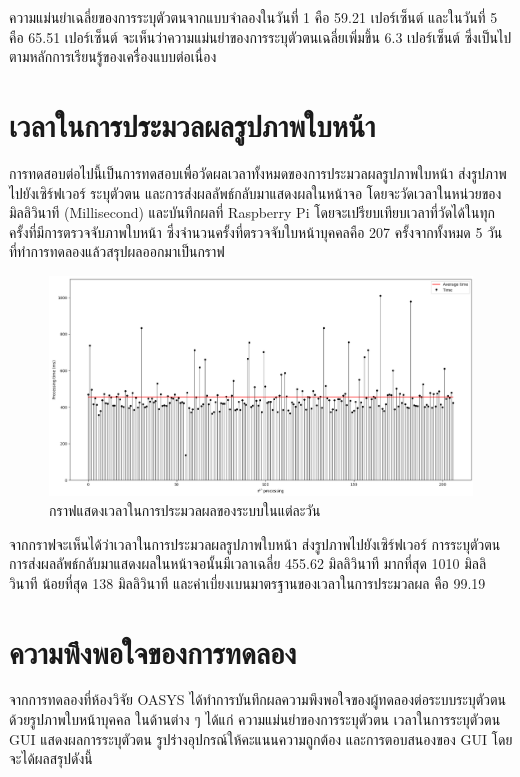 \indent ความแม่นยำเฉลี่ยของการระบุตัวตนจากแบบจำลองในวันที่ 1 คือ 59.21 เปอร์เซ็นต์ และในวันที่ 5 คือ 65.51 เปอร์เซ็นต์ จะเห็นว่าความแม่นยำของการระบุตัวตนเฉลี่ยเพิ่มขึ้น 6.3 เปอร์เซ็นต์ 
ซึ่งเป็นไปตามหลักการเรียนรู้ของเครื่องแบบต่อเนื่อง



\section{เวลาในการประมวลผลรูปภาพใบหน้า}
การทดสอบต่อไปนี้เป็นการทดสอบเพื่อวัดผลเวลาทั้งหมดของการประมวลผลรูปภาพใบหน้า ส่งรูปภาพไปยังเซิร์ฟเวอร์ ระบุตัวตน และการส่งผลลัพธ์กลับมาแสดงผลในหน้าจอ
โดยจะวัดเวลาในหน่วยของมิลลิวินาที (Millisecond) และบันทึกผลที่ Raspberry Pi โดยจะเปรียบเทียบเวลาที่วัดได้ในทุกครั้งที่มีการตรวจจับภาพใบหน้า 
ซึ่งจำนวนครั้งที่ตรวจจับใบหน้าบุคคลคือ 207 ครั้งจากทั้งหมด 5 วันที่ทำการทดลองแล้วสรุปผลออกมาเป็นกราฟ
  
\begin{figure}[!ht]
  \begin{center}
    \includegraphics[scale=.4]{pic/Time_1.png}
    \caption[กราฟแสดงเวลาในการประมวลผลของระบบในแต่ละวัน]{กราฟแสดงเวลาในการประมวลผลของระบบในแต่ละวัน}
    \label{fig:time_graph}
  \end{center}
\end{figure}
\newpage
\indent จากกราฟจะเห็นได้ว่าเวลาในการประมวลผลรูปภาพใบหน้า ส่งรูปภาพไปยังเซิร์ฟเวอร์ การระบุตัวตน การส่งผลลัพธ์กลับมาแสดงผลในหน้าจอนั้นมีเวลาเฉลี่ย 455.62 มิลลิวินาที มากที่สุด 1010 มิลลิวินาที 
น้อยที่สุด 138 มิลลิวินาที และค่าเบี่ยงเบนมาตรฐานของเวลาในการประมวลผล คือ 99.19



\section{ความพึงพอใจของการทดลอง}
จากการทดลองที่ห้องวิจัย OASYS ได้ทำการบันทึกผลความพึงพอใจของผู้ทดลองต่อระบบระบุตัวตนด้วยรูปภาพใบหน้าบุคคล ในด้านต่าง ๆ ได้แก่ 
ความแม่นยำของการระบุตัวตน เวลาในการระบุตัวตน GUI แสดงผลการระบุตัวตน รูปร่างอุปกรณ์ให้คะแนนความถูกต้อง และการตอบสนองของ GUI โดยจะได้ผลสรุปดังนี้

